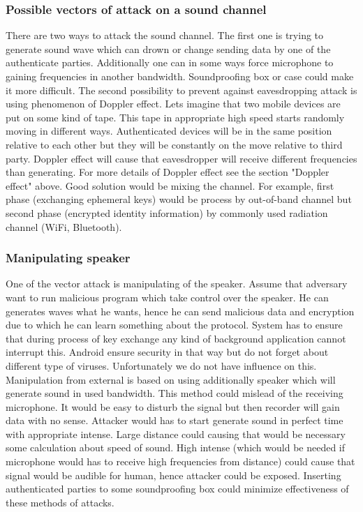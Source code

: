 \documentclass[11pt,titlepage]{article}
\theoremstyle{plain}
\begin{document}
\subsubsection{Possible vectors of attack on a sound channel}
There are two ways to attack the sound channel. The first one is trying to generate sound wave which can drown or change sending data by one of the authenticate parties. Additionally one can in some ways force microphone to gaining frequencies in another bandwidth. Soundproofing box or case could make it more difficult. The second possibility to prevent against eavesdropping attack is using phenomenon of Doppler effect. Lets imagine that two mobile devices are put on some kind of tape. This tape in appropriate high speed starts randomly moving in different ways. Authenticated devices will be in the same position relative to each other but they will be constantly on the move relative to third party. Doppler effect will cause that eavesdropper will receive different frequencies than generating. For more details of Doppler effect see the section "Doppler effect" above. Good solution would be mixing the channel. For example, first phase (exchanging ephemeral keys) would be process by out-of-band channel but second phase (encrypted identity information) by commonly used radiation channel (WiFi, Bluetooth).

\subsubsection{Manipulating speaker}
One of the vector attack is manipulating of the speaker. Assume that adversary want to run malicious program which take control over the speaker. He can generates waves what he wants, hence he can send malicious data and encryption due to which he can learn something about the protocol. System has to ensure that during process of key exchange any kind of background application cannot interrupt this. Android ensure security in that way but do not forget about different type of viruses. Unfortunately we do not have influence on this. Manipulation from external is based on using additionally speaker which will generate sound in used bandwidth. This method could mislead of the receiving microphone. It would be easy to disturb the signal but then recorder will gain data with no sense. Attacker would has to start generate sound in perfect time with appropriate intense. Large distance could causing that would be necessary some calculation about speed of sound. High intense (which would be needed if microphone would has to receive high frequencies from distance) could cause that signal would be audible for human, hence attacker could be exposed. Inserting authenticated parties to some soundproofing box could minimize effectiveness of these methods of attacks.
\end{document}
